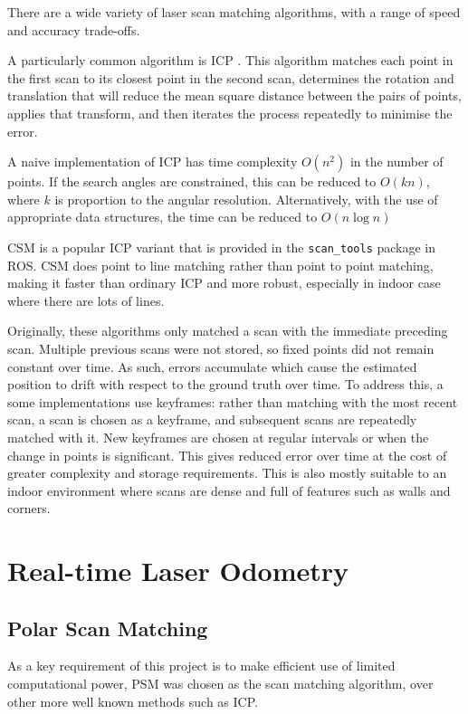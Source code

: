 \documentclass[12pt,oneside,a4paper]{book}
\begin{document}
There are a wide variety of laser scan matching algorithms, with a
range of speed and accuracy trade-offs.

A particularly common algorithm is \gls{ICP} \cite{icp}. This
algorithm matches each point in the first scan to its closest point in
the second scan, determines the rotation and translation that will
reduce the mean square distance between the pairs of points, applies
that transform, and then iterates the process repeatedly to minimise
the error.

A naive implementation of ICP has time complexity $O(n^2)$ in the
number of points. If the search angles are constrained, this can be
reduced to $O(kn)$, where $k$ is proportion to the angular
resolution. Alternatively, with the use of appropriate data
structures, the time can be reduced to $O(n\log n)$

\gls{CSM} \cite{csm} is a popular ICP variant that is provided in the
\texttt{scan\_tools} package in ROS. CSM does point to line matching
rather than point to point matching, making it faster than ordinary
ICP and more robust, especially in indoor case where there are lots of
lines.
 
Originally, these algorithms only matched a scan with the immediate
preceding scan. Multiple previous scans were not stored, so fixed
points did not remain constant over time. As such, errors accumulate
which cause the estimated position to drift with respect to the ground
truth over time. To address this, a some implementations use
keyframes: rather than matching with the most recent scan, a scan is
chosen as a keyframe, and subsequent scans are repeatedly matched with
it. New keyframes are chosen at regular intervals or when the change
in points is significant. This gives reduced error over time at the
cost of greater complexity and storage requirements. This is also
mostly suitable to an indoor environment where scans are dense and
full of features such as walls and corners.

\chapter{Real-time Laser Odometry}
\label{cha:rtlo}

\section{Polar Scan Matching}
\label{sec:polar-scan-matching}

As a key requirement of this project is to make efficient use of
limited computational power, \gls{PSM} was chosen as the
scan matching algorithm, over other more well known methods
such as \gls{ICP}.
\end{document}
